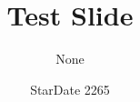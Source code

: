 \documentclass{beamer}
\title{Test Slide}
\author{None}
\date{StarDate 2265}
\begin{document}
\begin{frame}
\titlepage
\end{frame}
\end{document}
